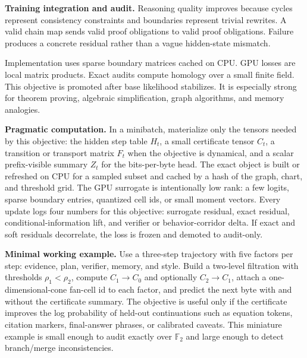 \documentclass[10pt]{article}
\newcommand{\FF}{\mathbb{F}}
\numberwithin{equation}{section}
\begin{document}
\noindent\textbf{Training integration and audit.} Reasoning quality improves because cycles represent consistency constraints and boundaries represent trivial rewrites. A valid chain map sends valid proof obligations to valid proof obligations. Failure produces a concrete residual rather than a vague hidden-state mismatch.

Implementation uses sparse boundary matrices cached on CPU. GPU losses are local matrix products. Exact audits compute homology over a small finite field. This objective is promoted after base likelihood stabilizes. It is especially strong for theorem proving, algebraic simplification, graph algorithms, and memory analogies.

\noindent\textbf{Pragmatic computation.} In a minibatch, materialize only the tensors needed by this objective: the hidden step table $H_t$, a small certificate tensor $C_t$, a transition or transport matrix $F_t$ when the objective is dynamical, and a scalar prefix-visible summary $Z_t$ for the bits-per-byte head. The exact object is built or refreshed on CPU for a sampled subset and cached by a hash of the graph, chart, and threshold grid. The GPU surrogate is intentionally low rank: a few logits, sparse boundary entries, quantized cell ids, or small moment vectors. Every update logs four numbers for this objective: surrogate residual, exact residual, conditional-information lift, and verifier or behavior-corridor delta. If exact and soft residuals decorrelate, the loss is frozen and demoted to audit-only.

\noindent\textbf{Minimal working example.} Use a three-step trajectory with five factors per step: evidence, plan, verifier, memory, and style. Build a two-level filtration with thresholds $\rho_1<\rho_2$, compute $C_1\to C_0$ and optionally $C_2\to C_1$, attach a one-dimensional-cone fan-cell id to each factor, and predict the next byte with and without the certificate summary. The objective is useful only if the certificate improves the log probability of held-out continuations such as equation tokens, citation markers, final-answer phrases, or calibrated caveats. This miniature example is small enough to audit exactly over $\FF_2$ and large enough to detect branch/merge inconsistencies.
\end{document}

